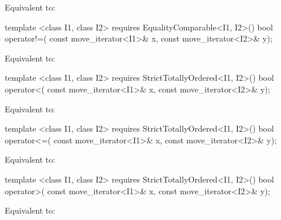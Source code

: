 \begin{itemdescr}
\pnum
\effects Equivalent to:
\end{itemdescr}

%
%
\begin{itemdecl}
template <class I1, class I2>
    requires EqualityComparable<I1, I2>()
  bool operator!=(
    const move_iterator<I1>& x, const move_iterator<I2>& y);
\end{itemdecl}

\begin{itemdescr}
\pnum
\effects Equivalent to:
\end{itemdescr}

%
%
\begin{itemdecl}
template <class I1, class I2>
    requires StrictTotallyOrdered<I1, I2>()
  bool operator<(
    const move_iterator<I1>& x, const move_iterator<I2>& y);
\end{itemdecl}

\begin{itemdescr}
\pnum
\effects Equivalent to:
\end{itemdescr}

%
%
\begin{itemdecl}
template <class I1, class I2>
    requires StrictTotallyOrdered<I1, I2>()
  bool operator<=(
    const move_iterator<I1>& x, const move_iterator<I2>& y);
\end{itemdecl}

\begin{itemdescr}
\pnum
\effects Equivalent to:
\end{itemdescr}

%
%
\begin{itemdecl}
template <class I1, class I2>
    requires StrictTotallyOrdered<I1, I2>()
  bool operator>(
    const move_iterator<I1>& x, const move_iterator<I2>& y);
\end{itemdecl}

\begin{itemdescr}
\pnum
\effects Equivalent to:
\end{itemdescr}

